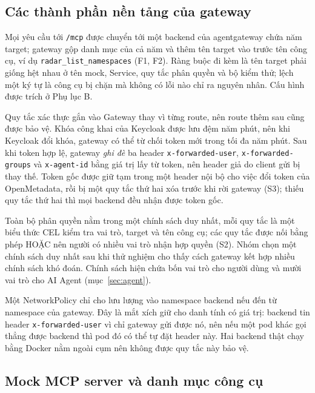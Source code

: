 \documentclass[a4paper]{article}
\begin{document}
\subsection{Các thành phần nền tảng của gateway}\label{sec:netpol}

Mọi yêu cầu tới \texttt{/mcp} được chuyển tới một backend của agentgateway chứa năm target; gateway gộp danh mục của cả năm và thêm tên target vào trước tên công cụ, ví dụ \texttt{radar\_list\_namespaces} (F1, F2). Ràng buộc đi kèm là tên target phải giống hệt nhau ở tên mock, Service, quy tắc phân quyền và bộ kiểm thử; lệch một ký tự là công cụ bị chặn mà không có lỗi nào chỉ ra nguyên nhân. Cấu hình được trích ở Phụ lục B.

Quy tắc xác thực gắn vào Gateway thay vì từng route, nên route thêm sau cũng được bảo vệ. Khóa công khai của Keycloak được lưu đệm năm phút, nên khi Keycloak đổi khóa, gateway có thể từ chối token mới trong tối đa năm phút. Sau khi token hợp lệ, gateway \emph{ghi đè} ba header \texttt{x-forwarded-user}, \texttt{x-forwarded-groups} và \texttt{x-agent-id} bằng giá trị lấy từ token, nên header giả do client gửi bị thay thế. Token gốc được giữ tạm trong một header nội bộ cho việc đổi token của OpenMetadata, rồi bị một quy tắc thứ hai xóa trước khi rời gateway (S3); thiếu quy tắc thứ hai thì mọi backend đều nhận được token gốc.

Toàn bộ phân quyền nằm trong một chính sách duy nhất, mỗi quy tắc là một biểu thức CEL kiểm tra vai trò, target và tên công cụ; các quy tắc được nối bằng phép HOẶC nên người có nhiều vai trò nhận hợp quyền (S2). Nhóm chọn một chính sách duy nhất sau khi thử nghiệm cho thấy cách gateway kết hợp nhiều chính sách khó đoán. Chính sách hiện chứa bốn vai trò cho người dùng và mười vai trò cho AI Agent (mục~\ref{sec:agent}).

Một NetworkPolicy chỉ cho lưu lượng vào namespace backend nếu đến từ namespace của gateway. Đây là mắt xích giữ cho danh tính có giá trị: backend tin header \texttt{x-forwarded-user} vì chỉ gateway gửi được nó, nên nếu một pod khác gọi thẳng được backend thì pod đó có thể tự đặt header này. Hai backend thật chạy bằng Docker nằm ngoài cụm nên không được quy tắc này bảo vệ.

\subsection{Mock MCP server và danh mục công cụ}
\end{document}
